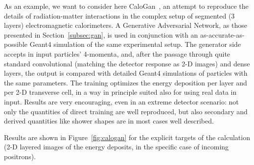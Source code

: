 As an example, we want to consider here CaloGan~\cite{Paganini2018}, an attempt to reproduce the details of radiation-matter interactions in the complex setup of segmented (3 layers) electromagnetic calorimeters.
A Generative Adversarial Network, as those presented in Section~\ref{subsec:gan}, is used in conjunction with an as-accurate-as-possible Geant4 simulation of the same experimental setup. The generator side accepts in input particles' 4-momenta, and, after the passage through quite standard convolutional (matching the detector response as 2-D images) and dense layers, the output is compared with detailed Geant4 simulations of particles with the same parameters.  The training optimizes the energy deposition per layer and per 2-D transverse cell, in a way in principle suited also for using real data in input. Results are very encouraging, even in an extreme detector scenario: not only the quantities of direct training are well reproduced, but also secondary and derived quantities like shower shapes are in most cases well described.

Results are shown in Figure~\ref{fig:calogan} for the explicit targets of the calculation (2-D layered images of the energy deposits, in the specific case of incoming positrons).


